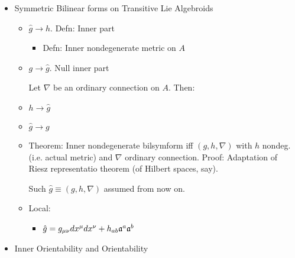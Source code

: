 {\begin{itemize}
\begin{itemize}
        \end{itemize}
    
    \item Symmetric Bilinear forms on Transitive Lie Algebroids
    
        \begin{itemize}
            
        \item $\hat g \to h$. Defn: Inner part
        
            \begin{itemize}
                
            \item Defn: Inner nondegenerate metric on $A$
                
            \end{itemize}
        
        \item $g \to \hat g$. Null inner part
        
        Let $\nabla$ be an ordinary connection on $A$. Then:
        
        \item $h \to \hat g$
        
        \item $\hat g \to g$
            
        \item Theorem: Inner nondegenerate bilsymform iff $(g, h, \nabla)$ with $h$ nondeg. (i.e. actual metric) and $\nabla$ ordinary connection. Proof: Adaptation of Riesz representatio theorem (of Hilbert spaces, say).
        
        Such $\hat g \equiv (g, h, \nabla)$ assumed from now on.
        
        \item Local:
        
            \begin{itemize}
                
            \item $\hat g = g_{\mu \nu} dx^\mu dx^\nu + h_{ab} \mathfrak{a}^a \mathfrak{a}^b$
                
            \end{itemize}
        
        \end{itemize}
    
    \item Inner Orientability and Orientability
    
        \begin{itemize}
            

\end{itemize}
\end{itemize}}
